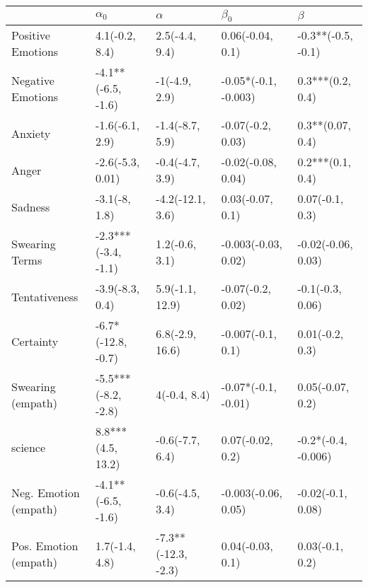 \begin{tabular}{lllll}
\toprule
{} &           $\alpha_0$ &             $\alpha$ &             $\beta_0$ &              $\beta$ \\
\midrule
Positive Emotions     &       4.1(-0.2, 8.4) &       2.5(-4.4, 9.4) &      0.06(-0.04, 0.1) &   -0.3**(-0.5, -0.1) \\
Negative Emotions     &   -4.1**(-6.5, -1.6) &        -1(-4.9, 2.9) &  -0.05*(-0.1, -0.003) &     0.3***(0.2, 0.4) \\
Anxiety               &      -1.6(-6.1, 2.9) &      -1.4(-8.7, 5.9) &     -0.07(-0.2, 0.03) &     0.3**(0.07, 0.4) \\
Anger                 &     -2.6(-5.3, 0.01) &      -0.4(-4.7, 3.9) &    -0.02(-0.08, 0.04) &     0.2***(0.1, 0.4) \\
Sadness               &        -3.1(-8, 1.8) &     -4.2(-12.1, 3.6) &      0.03(-0.07, 0.1) &      0.07(-0.1, 0.3) \\
Swearing Terms        &  -2.3***(-3.4, -1.1) &       1.2(-0.6, 3.1) &   -0.003(-0.03, 0.02) &   -0.02(-0.06, 0.03) \\
Tentativeness         &      -3.9(-8.3, 0.4) &      5.9(-1.1, 12.9) &     -0.07(-0.2, 0.02) &     -0.1(-0.3, 0.06) \\
Certainty             &   -6.7*(-12.8, -0.7) &      6.8(-2.9, 16.6) &     -0.007(-0.1, 0.1) &      0.01(-0.2, 0.3) \\
Swearing (empath)     &  -5.5***(-8.2, -2.8) &         4(-0.4, 8.4) &   -0.07*(-0.1, -0.01) &     0.05(-0.07, 0.2) \\
science               &    8.8***(4.5, 13.2) &      -0.6(-7.7, 6.4) &      0.07(-0.02, 0.2) &  -0.2*(-0.4, -0.006) \\
Neg. Emotion (empath) &   -4.1**(-6.5, -1.6) &      -0.6(-4.5, 3.4) &   -0.003(-0.06, 0.05) &    -0.02(-0.1, 0.08) \\
Pos. Emotion (empath) &       1.7(-1.4, 4.8) &  -7.3**(-12.3, -2.3) &      0.04(-0.03, 0.1) &      0.03(-0.1, 0.2) \\
\bottomrule
\end{tabular}

